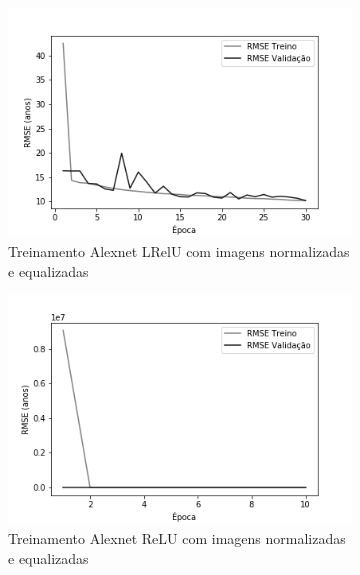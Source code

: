 \begin{figure}[hb!]
	\caption{Redes neurais biológicas.}
	\begin{subfigure}[hb]{0.5\linewidth}
		\caption{Treinamento Alexnet LRelU com imagens normalizadas e equalizadas}
		\label{fig:histalexlrelunorm}
    \centering
		\includegraphics[width=\linewidth]{img/graficos-fase2/fig-history-alexnet-lrelu-data-augmentation-22.png}
	\end{subfigure}
	\begin{subfigure}[hb]{0.5\linewidth}
		\caption{Treinamento Alexnet ReLU com imagens normalizadas e equalizadas}
		\label{fig:redeneuralbiologica}
		\includegraphics[width=\linewidth]{img/graficos-fase2/fig-history-alexnet-relu-data-augmentation-21.png}
	\end{subfigure}\\
  \begin{subfigure}[hb]{0.5\linewidth}

\end{subfigure}
\end{figure}
